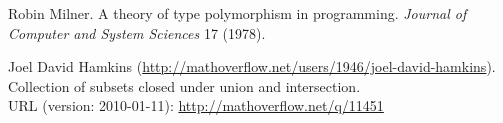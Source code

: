 \begin{thebibliography}{99}
Robin Milner.
A theory of type polymorphism in programming.
\emph{Journal of Computer and System Sciences} 17 (1978).

Joel David Hamkins
(\hbox{\url{http://mathoverflow.net/users/1946/joel-david-hamkins}}).\\
Collection of subsets closed under union and intersection.\\
URL (version: 2010-01-11): \hbox{\url{http://mathoverflow.net/q/11451}}
\end{thebibliography}
